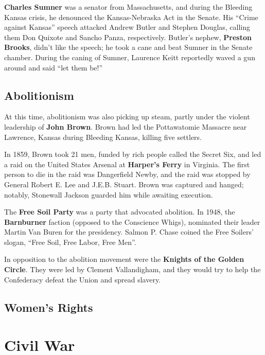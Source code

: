 \textbf{Charles Sumner} was a senator from Massachusetts,
and during the Bleeding Kansas crisis, he denounced the Kansas-Nebraska Act in the Senate.
His ``Crime against Kansas'' speech attacked Andrew Butler and Stephen Douglas,
calling them Don Quixote and Sancho Panza, respectively.
Butler's nephew, \textbf{Preston Brooks}, didn't like the speech;
he took a cane and beat Sumner in the Senate chamber.
During the caning of Sumner, Laurence Keitt reportedly waved a gun around and said ``let them be!''

\subsection*{Abolitionism}

At this time, abolitionism was also picking up steam,
partly under the violent leadership of \textbf{John Brown}.
Brown had led the Pottawatomie Massacre near Lawrence, Kansas
during Bleeding Kansas, killing five settlers.

In 1859, Brown took 21 men, funded by rich people called the Secret Six,
and led a raid on the United States Arsenal at \textbf{Harper's Ferry} in Virginia.
The first person to die in the raid was Dangerfield Newby,
and the raid was stopped by General Robert E. Lee and J.E.B. Stuart.
Brown was captured and hanged;
notably, Stonewall Jackson guarded him while awaiting execution.

The \textbf{Free Soil Party} was a party that advocated abolition.
In 1948, the \textbf{Barnburner} faction (opposed to the Conscience Whigs),
nominated their leader Martin Van Buren for the presidency.
Salmon P. Chase coined the Free Soilers' slogan, ``Free Soil, Free Labor, Free Men''.

In opposition to the abolition movement were the \textbf{Knights of the Golden Circle}.
They were led by Clement Vallandigham, and they would try to help the Confederacy defeat the Union
and spread slavery.

\subsection*{Women's Rights}

\section{Civil War}

